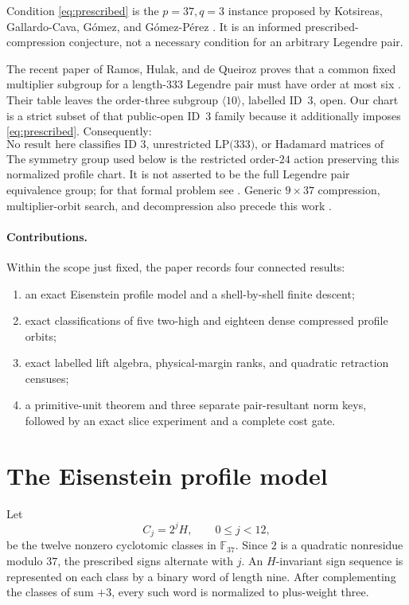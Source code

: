 \documentclass[11pt]{article}
\theoremstyle{remark}
\newcommand{\F}{\mathbb F}
\begin{document}
Condition \eqref{eq:prescribed} is the $p=37,q=3$ instance proposed by
Kotsireas, Gallardo-Cava, G\'omez, and G\'omez-P\'erez
\cite{kotsireas2027}.  It is an informed prescribed-compression
conjecture, not a necessary condition for an arbitrary Legendre pair.

The recent paper of Ramos, Hulak, and de Queiroz proves that a common fixed
multiplier subgroup for a length-$333$ Legendre pair must have order at
most six \cite{ramos2026}.  Their table leaves the order-three subgroup
$\langle10\rangle$, labelled ID~3, open.  Our chart is a strict subset of
that public-open ID~3 family because it additionally imposes
\eqref{eq:prescribed}.  Consequently:
\begin{equation*}
\boxed{\text{No result here classifies ID~3, unrestricted LP(333), or
Hadamard matrices of order 668.}}
\end{equation*}
The symmetry group used below is the restricted order-$24$ action preserving
this normalized profile chart.  It is not asserted to be the full Legendre
pair equivalence group; for that formal problem see
\cite{bulutoglu2026}.  Generic $9\times37$ compression, multiplier-orbit
search, and decompression also precede this work
\cite{chojecki2026,kotsireas2027}.

\paragraph{Contributions.}
Within the scope just fixed, the paper records four connected results:
\begin{enumerate}
\item an exact Eisenstein profile model and a shell-by-shell finite descent;
\item exact classifications of five two-high and eighteen dense compressed
profile orbits;
\item exact labelled lift algebra, physical-margin ranks, and quadratic
retraction censuses;
\item a primitive-unit theorem and three separate pair-resultant norm keys,
followed by an exact slice experiment and a complete cost gate.
\end{enumerate}

\section{The Eisenstein profile model}
\label{sec:profile}

Let
\[
 C_j=2^jH,\qquad 0\leq j<12,
\]
be the twelve nonzero cyclotomic classes in $\F_{37}$.  Since $2$ is a
quadratic nonresidue modulo $37$, the prescribed signs alternate with
$j$.  An $H$-invariant sign sequence is represented on each class by a
binary word of length nine.  After complementing the classes of sum $+3$,
every such word is normalized to plus-weight three.
\end{document}
